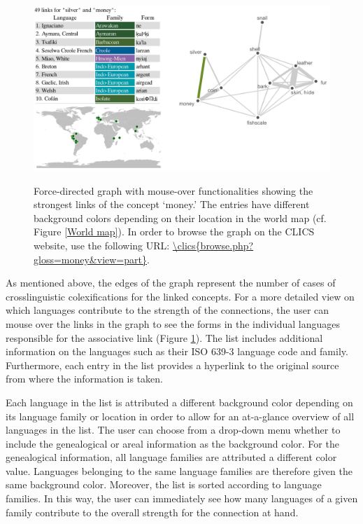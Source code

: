 \begin{figure}[htbp]
\begin{center}
    \href{\clics{browse.php?gloss=money&view=part}}{\includegraphics[width=\textwidth]{img/silver-image.png}}
\caption{Force-directed graph with mouse-over functionalities showing the strongest links of the
concept `{money}.' The entries have different background colors depending on their location in the
world map (cf. Figure \ref{World map}). In order to browse the graph on the CLICS website, use the
following URL: \url{\clics{browse.php?gloss=money&view=part}}.}
\label{MoneySilver}
\end{center}
\end{figure}




As mentioned above, the edges of the graph represent the number of cases of crosslinguistic colexifications for the linked concepts. For a more detailed view on which languages contribute to the strength of the connections, the user can mouse over the links in the graph to see the forms in the individual languages responsible for the associative link (Figure \ref{MoneySilver}). The list includes additional information on the languages such as their ISO 639-3 language code and family. Furthermore, each entry in the list provides a hyperlink to the original source from where the information is taken.  


Each language in the list is attributed a different background color depending on its language family or location in order to allow for an at-a-glance overview of all languages in the list. The user can choose from a drop-down menu whether to include the genealogical or areal information as the background color. For the genealogical information, all language families are attributed a different color value. Languages belonging to the same language families are therefore given the same background color. Moreover, the list is sorted according to language families. In this way, the user can immediately see how many languages of  a given family contribute to the overall strength for the connection at hand. 


